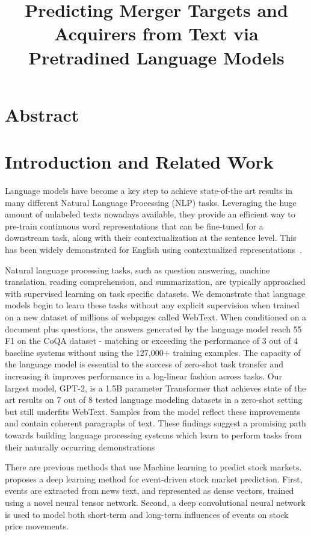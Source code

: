 \documentclass[11pt]{article}
\title{\vspace{-4cm} Predicting Merger Targets and Acquirers from Text via Pretradined Language Models}
\author{}
\date{}
\begin{document}
\maketitle

\section{Abstract}

\section{Introduction and Related Work}

Language models have become a key step to achieve state-of-the art results in many different Natural Language Processing (NLP)
tasks. Leveraging the huge amount of unlabeled texts nowadays available, they provide an efficient way to pre-train continuous word
representations that can be fine-tuned for a downstream task, along with their contextualization at the sentence level. This has been
widely demonstrated for English using contextualized representations~\cite{dai2015, peters2018, howard2018, radford2018, devlin2019, yang2019}.

Natural language processing tasks, such as question answering, machine translation, reading comprehension, and summarization, are typically
approached with supervised learning on task specific datasets. We demonstrate that language
models begin to learn these tasks without any explicit supervision when trained on a new dataset
of millions of webpages called WebText. When
conditioned on a document plus questions, the answers generated by the language model reach 55
F1 on the CoQA dataset - matching or exceeding
the performance of 3 out of 4 baseline systems
without using the 127,000+ training examples.
The capacity of the language model is essential
to the success of zero-shot task transfer and increasing it improves performance in a log-linear
fashion across tasks. Our largest model, GPT-2,
is a 1.5B parameter Transformer that achieves
state of the art results on 7 out of 8 tested language modeling datasets in a zero-shot setting
but still underfits WebText. Samples from the
model reflect these improvements and contain coherent paragraphs of text. These findings suggest
a promising path towards building language processing systems which learn to perform tasks from
their naturally occurring demonstrations~\cite{radford2019} 


There are previous methods that use Machine learning to predict stock
markets.~\cite{ding2015} proposes a deep learning method for
event-driven stock market prediction. First, events are extracted from news text, and represented as dense vectors,
trained using a novel neural tensor network. Second, a deep convolutional neural network is used to model both short-term and
long-term influences of events on stock price movements.
\end{document}
